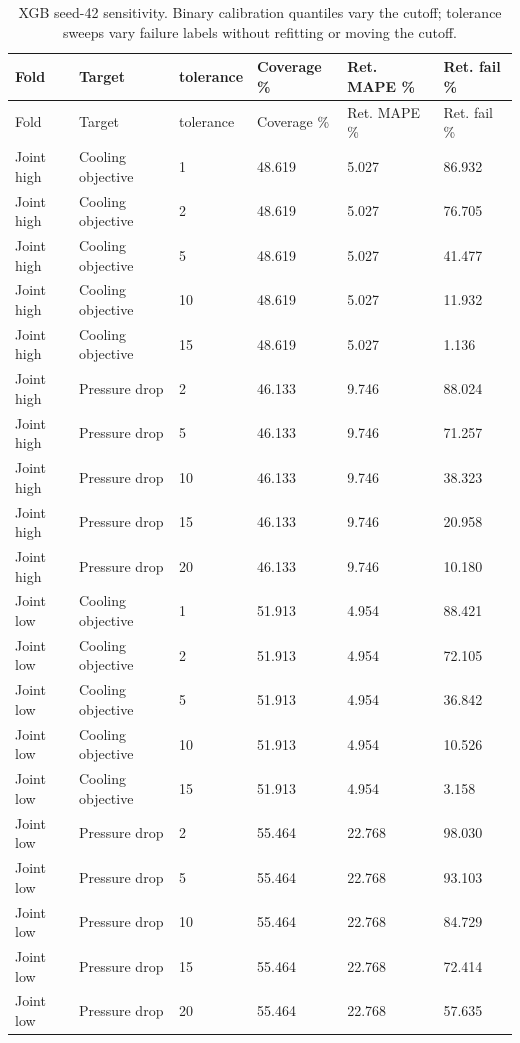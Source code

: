 \begingroup\small\setlength{\tabcolsep}{3pt}\begin{longtable}{llllll}
\caption{XGB seed-42 sensitivity. Binary calibration quantiles vary the cutoff; tolerance sweeps vary failure labels without refitting or moving the cutoff.}\label{tab:ubend-tolerances}\\\toprule
Fold & Target & tolerance & Coverage \% & Ret. MAPE \% & Ret. fail \%\\\midrule
\endfirsthead\toprule
Fold & Target & tolerance & Coverage \% & Ret. MAPE \% & Ret. fail \%\\\midrule
\endhead
Joint high & Cooling objective & 1 & 48.619 & 5.027 & 86.932\\
Joint high & Cooling objective & 2 & 48.619 & 5.027 & 76.705\\
Joint high & Cooling objective & 5 & 48.619 & 5.027 & 41.477\\
Joint high & Cooling objective & 10 & 48.619 & 5.027 & 11.932\\
Joint high & Cooling objective & 15 & 48.619 & 5.027 & 1.136\\
Joint high & Pressure drop & 2 & 46.133 & 9.746 & 88.024\\
Joint high & Pressure drop & 5 & 46.133 & 9.746 & 71.257\\
Joint high & Pressure drop & 10 & 46.133 & 9.746 & 38.323\\
Joint high & Pressure drop & 15 & 46.133 & 9.746 & 20.958\\
Joint high & Pressure drop & 20 & 46.133 & 9.746 & 10.180\\
Joint low & Cooling objective & 1 & 51.913 & 4.954 & 88.421\\
Joint low & Cooling objective & 2 & 51.913 & 4.954 & 72.105\\
Joint low & Cooling objective & 5 & 51.913 & 4.954 & 36.842\\
Joint low & Cooling objective & 10 & 51.913 & 4.954 & 10.526\\
Joint low & Cooling objective & 15 & 51.913 & 4.954 & 3.158\\
Joint low & Pressure drop & 2 & 55.464 & 22.768 & 98.030\\
Joint low & Pressure drop & 5 & 55.464 & 22.768 & 93.103\\
Joint low & Pressure drop & 10 & 55.464 & 22.768 & 84.729\\
Joint low & Pressure drop & 15 & 55.464 & 22.768 & 72.414\\
Joint low & Pressure drop & 20 & 55.464 & 22.768 & 57.635\\

\end{longtable}
